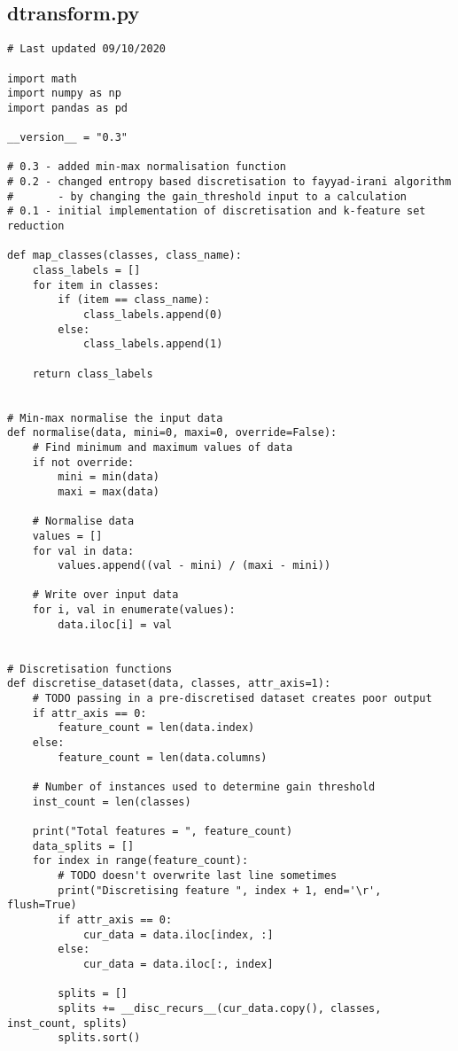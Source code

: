 \documentclass[11pt, a4paper]{article}
\begin{document}
\subsection{dtransform.py}
\begin{verbatim}
# Last updated 09/10/2020 

import math
import numpy as np
import pandas as pd

__version__ = "0.3"

# 0.3 - added min-max normalisation function
# 0.2 - changed entropy based discretisation to fayyad-irani algorithm
#       - by changing the gain_threshold input to a calculation
# 0.1 - initial implementation of discretisation and k-feature set reduction

def map_classes(classes, class_name):
    class_labels = []
    for item in classes:
        if (item == class_name):
            class_labels.append(0)
        else:
            class_labels.append(1)
        
    return class_labels


# Min-max normalise the input data
def normalise(data, mini=0, maxi=0, override=False):
    # Find minimum and maximum values of data
    if not override:
        mini = min(data)
        maxi = max(data)
    
    # Normalise data
    values = []
    for val in data:
        values.append((val - mini) / (maxi - mini))
        
    # Write over input data
    for i, val in enumerate(values):
        data.iloc[i] = val


# Discretisation functions
def discretise_dataset(data, classes, attr_axis=1):
    # TODO passing in a pre-discretised dataset creates poor output
    if attr_axis == 0:
        feature_count = len(data.index)
    else:
        feature_count = len(data.columns)
    
    # Number of instances used to determine gain threshold
    inst_count = len(classes)

    print("Total features = ", feature_count)
    data_splits = []
    for index in range(feature_count):
        # TODO doesn't overwrite last line sometimes
        print("Discretising feature ", index + 1, end='\r', flush=True)
        if attr_axis == 0:
            cur_data = data.iloc[index, :]
        else:
            cur_data = data.iloc[:, index]

        splits = []
        splits += __disc_recurs__(cur_data.copy(), classes, inst_count, splits)
        splits.sort()
        

\end{verbatim}
\end{document}
